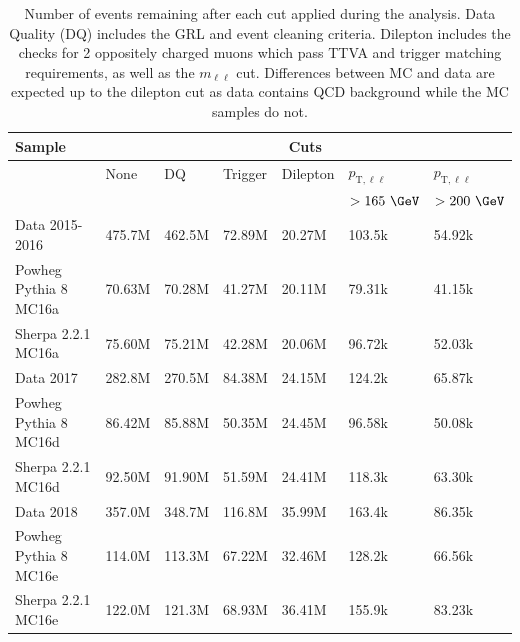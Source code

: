 \begin{table}[h!]
    \centering
    \begin{tabular}{l|l|l|l|l|l|l}
    \hline\hline
    \textbf{Sample} & \multicolumn{6}{c}{\textbf{Cuts}} \\ \hline
     & None & DQ & Trigger & Dilepton & $p_{\text{T},\ell\ell}$ & $p_{\text{T},\ell\ell}$ \\
     &  &  &  &  & $>165~\GeV$ & $>200~\GeV$ \\ \hline\hline
    Data 2015-2016 & 475.7M & 462.5M & 72.89M & 20.27M & 103.5k & 54.92k \\ \hline
    Powheg Pythia 8 MC16a & 70.63M & 70.28M & 41.27M & 20.11M & 79.31k & 41.15k \\ \hline
    Sherpa 2.2.1 MC16a & 75.60M & 75.21M & 42.28M & 20.06M & 96.72k & 52.03k \\ \hline\hline
    Data 2017 & 282.8M & 270.5M & 84.38M & 24.15M & 124.2k & 65.87k \\ \hline
    Powheg Pythia 8 MC16d & 86.42M & 85.88M & 50.35M & 24.45M & 96.58k & 50.08k \\ \hline
    Sherpa 2.2.1 MC16d & 92.50M & 91.90M & 51.59M & 24.41M & 118.3k & 63.30k \\ \hline\hline
    Data 2018 & 357.0M & 348.7M & 116.8M & 35.99M & 163.4k & 86.35k \\ \hline
    Powheg Pythia 8 MC16e & 114.0M & 113.3M & 67.22M & 32.46M & 128.2k & 66.56k \\ \hline
    Sherpa 2.2.1 MC16e & 122.0M & 121.3M & 68.93M & 36.41M & 155.9k & 83.23k \\ \hline\hline
    \end{tabular}
    \caption{Number of events remaining after each cut applied during the analysis. Data Quality (DQ) includes the GRL and event cleaning criteria.
    Dilepton includes the checks for 2 oppositely charged muons which pass TTVA and trigger matching requirements, as well as the $m_{\ell\ell}$ cut.
    Differences between MC and data are expected up to the dilepton cut as data contains QCD background while the MC samples do not.}
    \label{tab:CFComp}
\end{table}


